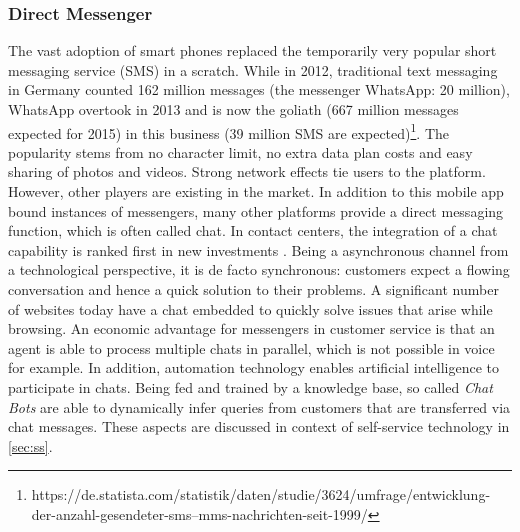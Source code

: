 		\subsubsection{Direct Messenger}
		The vast adoption of smart phones replaced the temporarily very popular short messaging service (SMS) in a scratch.  While in 2012, traditional text messaging in Germany counted 162 million messages (the messenger WhatsApp: 20 million), WhatsApp overtook in 2013 and is now the goliath (667 million messages expected for 2015) in this business (39 million SMS are expected)\footnote{\cf https://de.statista.com/statistik/daten/studie/3624/umfrage/entwicklung- der-anzahl-gesendeter-sms--mms-nachrichten-seit-1999/}. The popularity stems from no character limit, no extra data plan costs and easy sharing of photos and videos. Strong network effects tie users to the platform. However, other players are existing in the market. In addition to this mobile app bound instances of messengers, many other platforms provide a direct messaging function, which is often called chat. In contact centers, the integration of a chat capability is ranked first in new investments \citep{ccnet2016}. Being a asynchronous channel from a technological perspective, it is de facto synchronous: customers expect a flowing conversation and hence a quick solution to their problems. A significant number of websites today have a chat embedded to quickly solve issues that arise while browsing. An economic advantage for messengers in customer service is that an agent is able to process multiple chats in parallel, which is not possible in voice for example. In addition, automation technology enables artificial intelligence to participate in chats. Being fed and trained by a knowledge base, so called \textit{Chat Bots} are able to dynamically infer queries from customers that are transferred via chat messages. These aspects are discussed in context of self-service technology in \ref{sec:ss}.%
		

